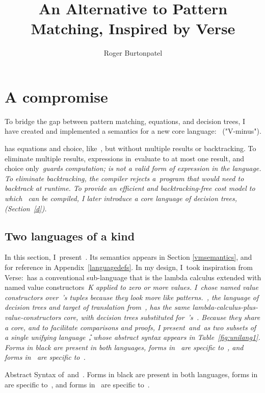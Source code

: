 \documentclass[manuscript,screen 12pt, nonacm]{acmart}
\title{An Alternative to Pattern Matching, Inspired by Verse}
\author{Roger Burtonpatel}
\affiliation{%
\institution{Tufts University}
\streetaddress{419 Boston Ave}
  \city{Medford}
  \state{Massachusetts}
  \country{USA}
  \postcode{02155}
  }
\begin{document}
  
\section{A compromise}
\label{compromise}
    
    To bridge the gap between pattern matching, equations, and decision trees, I
    have created and implemented a semantics for a new core language:~\VMinus
    ("V-minus"). 
    
    \VMinus has equations and choice, like~\VC, but without multiple results or
    backtracking. To eliminate multiple results, expressions in~\VMinus evaluate
    to at most one result, and choice only~\it{guards} computation; is not a
    valid form of expression in the language. To eliminate backtracking, the
    compiler rejects a~\VMinus program that would need to backtrack at runtime.
    To provide an efficient and backtracking-free cost model to which~\VMinus
    can be compiled, I later introduce a core language of decision trees,~\D
    (Section~\ref{d}). 

    \subsection{Two languages of a kind}
    
    In this section, I~present~\VMinus. Its semantics appears in Section
    \ref{vmsemantics}, and for reference in Appendix~\ref{languagedefs}. In my
    design, I~took inspiration from Verse:~\VMinus has a conventional
    sub-language that is the lambda calculus extended with named value
    constructors~\it{K} applied to zero or more values. I~chose named value
    constructors over~\VC's tuples because they look more like patterns.~\D, the
    language of decision trees and target of translation from~\VMinus, has the
    same lambda-calculus-plus-value-constructors core, with decision trees
    substituted for~\VMinus's~\iffibf. Because they share a core, and to
    facilitate comparisons and proofs, I present~\VMinus and~\D as two subsets
    of a single unifying language~\U, whose abstract syntax appears in
    Table~\ref{fig:unilang1}. Forms in black are present in both languages,
    forms in~ are specific to~\VMinus, and forms in~ are
    specific to~\D. 

    \begin{table}[ht]
      \utable
      \caption{Abstract Syntax of~\VMinus and~\D. Forms in black are present in
              both languages, forms in~ are specific to~\VMinus, and
              forms in~ are specific to~\D.}
      \label{fig:unilang1}
    \end{table}
\end{document}
